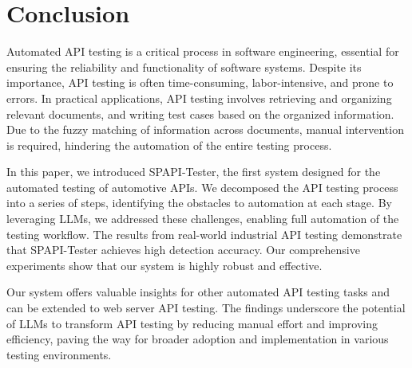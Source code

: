 \section{Conclusion}
Automated API testing is a critical process in software engineering, essential for ensuring the reliability and functionality of software systems. Despite its importance, API testing is often time-consuming, labor-intensive, and prone to errors. In practical applications, API testing involves retrieving and organizing relevant documents, and writing test cases based on the organized information. Due to the fuzzy matching of information across documents, manual intervention is required, hindering the automation of the entire testing process.

In this paper, we introduced SPAPI-Tester, the first system designed for the automated testing of automotive APIs. We decomposed the API testing process into a series of steps, identifying the obstacles to automation at each stage. By leveraging LLMs, we addressed these challenges, enabling full automation of the testing workflow. The results from real-world industrial API testing demonstrate that SPAPI-Tester achieves high detection accuracy. Our comprehensive experiments show that our system is highly robust and effective.

Our system offers valuable insights for other automated API testing tasks and can be extended to web server API testing. The findings underscore the potential of LLMs to transform API testing by reducing manual effort and improving efficiency, paving the way for broader adoption and implementation in various testing environments.